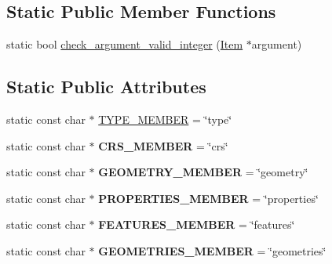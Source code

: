 \subsection*{Static Public Member Functions}
\begin{DoxyCompactItemize}
\item 
static bool \mbox{\hyperlink{classItem__func__geomfromgeojson_a9fc13ed90caf5dc7082535f71766e8ea}{check\+\_\+argument\+\_\+valid\+\_\+integer}} (\mbox{\hyperlink{classItem}{Item}} $\ast$argument)
\end{DoxyCompactItemize}
\subsection*{Static Public Attributes}
\begin{DoxyCompactItemize}
\item 
static const char $\ast$ \mbox{\hyperlink{classItem__func__geomfromgeojson_a0965464603a3ab0282ed4fb493381232}{T\+Y\+P\+E\+\_\+\+M\+E\+M\+B\+ER}} = \char`\"{}type\char`\"{}
\item 
\mbox{\label{classItem__func__geomfromgeojson_ac5f30655471e85479a814a0546edaaa2}} 
static const char $\ast$ {\bfseries C\+R\+S\+\_\+\+M\+E\+M\+B\+ER} = \char`\"{}crs\char`\"{}
\item 
\mbox{\label{classItem__func__geomfromgeojson_aff67c1ffd69b4362d65a1dad66b27a46}} 
static const char $\ast$ {\bfseries G\+E\+O\+M\+E\+T\+R\+Y\+\_\+\+M\+E\+M\+B\+ER} = \char`\"{}geometry\char`\"{}
\item 
\mbox{\label{classItem__func__geomfromgeojson_aea3fa84bc705a362d01cca75d6088ab4}} 
static const char $\ast$ {\bfseries P\+R\+O\+P\+E\+R\+T\+I\+E\+S\+\_\+\+M\+E\+M\+B\+ER} = \char`\"{}properties\char`\"{}
\item 
\mbox{\label{classItem__func__geomfromgeojson_af5cd21271c8b4a506198add0dd28bcac}} 
static const char $\ast$ {\bfseries F\+E\+A\+T\+U\+R\+E\+S\+\_\+\+M\+E\+M\+B\+ER} = \char`\"{}features\char`\"{}
\item 
\mbox{\label{classItem__func__geomfromgeojson_a5b7278f8bdbf154aa69678d26f790b85}} 
static const char $\ast$ {\bfseries G\+E\+O\+M\+E\+T\+R\+I\+E\+S\+\_\+\+M\+E\+M\+B\+ER} = \char`\"{}geometries\char`\"{}

\end{DoxyCompactItemize}
